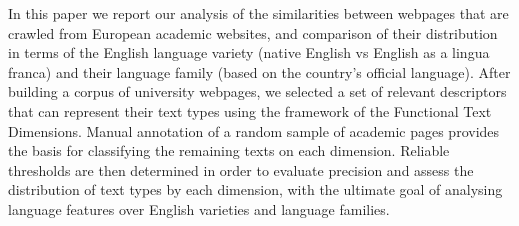 In this paper we report our analysis of the similarities between webpages that are crawled from European academic websites, and comparison of their distribution in terms of the English language variety (native English vs English as a lingua franca) and their language family (based on the country's official language).  After building a corpus of university webpages, we selected a set of relevant descriptors that can represent their text types using the framework of the Functional Text Dimensions. Manual annotation of a random sample of academic pages provides the basis for classifying the remaining texts on each dimension.  Reliable thresholds are then determined in order to evaluate precision and assess the distribution of text types by each dimension, with the ultimate goal of analysing language features over English varieties and language families.
